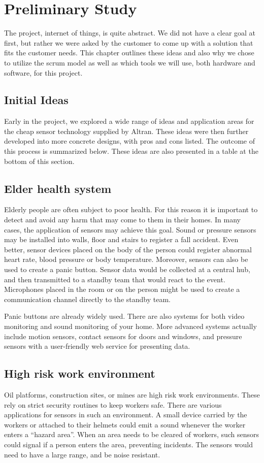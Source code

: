 \documentclass[../document]{subfiles}
\begin{document}
\section{Preliminary Study}
The project, internet of things, is quite abstract. We did not have a clear goal at first, but rather we were asked by the customer to come up with a solution that fits the customer needs. This chapter outlines these ideas and also why we chose to utilize the scrum model as well as which tools we will use, both hardware and software, for this project.

\subsection{Initial Ideas}
Early in the project, we explored a wide range of ideas and application areas for the cheap sensor technology supplied by Altran. These ideas were then further developed into more concrete designs, with pros and cons listed. The outcome of this process is summarized below. These ideas are also presented in a table at the bottom of this section.

\subsection{Elder health system}
Elderly people are often subject to poor health. For this reason it is important to detect and avoid any harm that may come to them in their homes. In many cases, the application of sensors may achieve this goal. Sound or pressure sensors may be installed into walls, floor and stairs to register a fall accident. Even better, sensor devices placed on the body of the person could register abnormal heart rate, blood pressure or body temperature. Moreover, sensors can also be used to create a panic button. Sensor data would be collected at a central hub, and then transmitted to a standby team that would react to the event. Microphones placed in the room or on the person might be used to create a communication channel directly to the standby team.

Panic buttons are already widely used. There are also systems for both video monitoring and sound monitoring of your home. More advanced systems actually include motion sensors, contact sensors for doors and windows, and pressure sensors with a user-friendly web service for presenting data.

\subsection{High risk work environment}
Oil platforms, construction sites, or mines are high risk work environments. These rely on strict security routines to keep workers safe. There are various applications for sensors in such an environment. A small device carried by the workers or attached to their helmets could emit a sound whenever the worker enters a “hazard area”. When an area needs to be cleared of workers, such sensors could signal if a person enters the area, preventing incidents. The sensors would need to have a large range, and be noise resistant.
\end{document}
